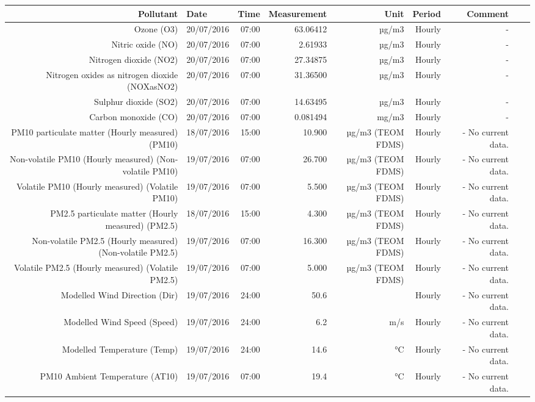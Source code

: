 \begin{table}[ht]
\centering
\begin{adjustbox}{width=1.2\textwidth,center=\textwidth}
\begin{tabular}{rlrrrrrrr}
  \hline
 Pollutant & Date & Time & Measurement & Unit & Period & Comment  \\ \hline
    Ozone (O3) & 20/07/2016 & 07:00 & 63.06412 & µg/m3 & Hourly & - \\
    Nitric oxide (NO) & 20/07/2016 & 07:00 & 2.61933 & µg/m3 & Hourly & - \\
    Nitrogen dioxide (NO2) & 20/07/2016 & 07:00 & 27.34875 & µg/m3 & Hourly & - \\
    Nitrogen oxides as nitrogen dioxide (NOXasNO2) & 20/07/2016 & 07:00 & 31.36500 & µg/m3 & Hourly & - \\
	Sulphur dioxide (SO2) & 20/07/2016 & 07:00 & 14.63495 & µg/m3 & Hourly & - \\
	Carbon monoxide (CO) & 20/07/2016 & 07:00 & 0.081494 & mg/m3 & Hourly & - \\
	PM10 particulate matter (Hourly measured) (PM10) & 18/07/2016 & 15:00 & 10.900 & µg/m3 (TEOM FDMS) & Hourly & - No current data. \\
	Non-volatile PM10 (Hourly measured) (Non-volatile PM10) & 19/07/2016 & 07:00 & 26.700 & µg/m3 (TEOM FDMS) & Hourly & - No current data. \\
	Volatile PM10 (Hourly measured) (Volatile PM10) & 19/07/2016 & 07:00 & 5.500 & µg/m3 (TEOM FDMS) & Hourly & - No current data. \\
	PM2.5 particulate matter (Hourly measured) (PM2.5) & 18/07/2016 & 15:00 & 4.300 & µg/m3 (TEOM FDMS) & Hourly & - No current data. \\
	Non-volatile PM2.5 (Hourly measured) (Non-volatile PM2.5) & 19/07/2016 & 07:00 & 16.300 & µg/m3 (TEOM FDMS) & Hourly & - No current data. \\
	Volatile PM2.5 (Hourly measured) (Volatile PM2.5) & 19/07/2016 & 07:00 & 5.000 & µg/m3 (TEOM FDMS) & Hourly & - No current data. \\
	Modelled Wind Direction (Dir) & 19/07/2016 & 24:00 & 50.6 & \degree & Hourly & - No current data. \\
	Modelled Wind Speed (Speed) & 19/07/2016 & 24:00 & 6.2 & m/s & Hourly & - No current data. \\
	Modelled Temperature (Temp) & 19/07/2016 & 24:00 & 14.6 & °C & Hourly & - No current data. \\
	PM10 Ambient Temperature (AT10) & 19/07/2016 & 07:00 & 19.4 & °C & Hourly & - No current data. \\

\end{tabular}
\end{adjustbox}
\end{table}
